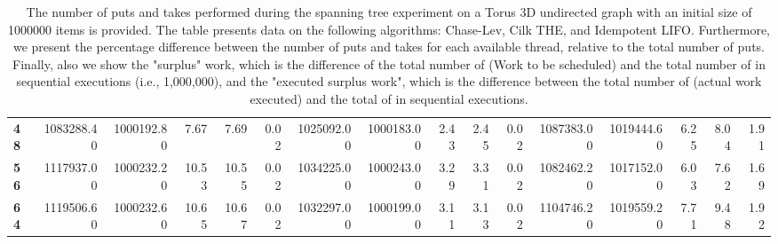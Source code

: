 \begin{table}[!ht]
{\begin{tabular}{lrrrrrrrrrrrrrrr}
\textbf{48} & 1083288.40 & 1000192.80 &           7.67 &        7.69 &                 0.02 & 1025092.00 & 1000183.00 &           2.43 &        2.45 &                 0.02 &      1087383.00 & 1019444.60 &           6.25 &        8.04 &                 1.91 \\
\textbf{56} & 1117937.00 & 1000232.20 &          10.53 &       10.55 &                 0.02 & 1034225.00 & 1000243.00 &           3.29 &        3.31 &                 0.02 &      1082462.20 & 1017152.00 &           6.03 &        7.62 &                 1.69 \\
\textbf{64} & 1119506.60 & 1000232.60 &          10.65 &       10.67 &                 0.02 & 1032297.00 & 1000199.00 &           3.11 &        3.13 &                 0.02 &      1104746.20 & 1019559.20 &           7.71 &        9.48 &                 1.92 \\
\bottomrule
\end{tabular}}
\label{difference-Torus_3D_undirected-1000000-CHASELEV-CILK-IDEMPOTENT_LIFO}
\caption{The number of puts and takes performed during the
    spanning tree experiment on a Torus 3D undirected graph with an initial size
    of 1000000 items is provided. The table presents data on the
    following algorithms: Chase-Lev, Cilk THE, and
    Idempotent LIFO. Furthermore, we present the percentage difference
    between the number of puts and takes for each available thread,
    relative to the total number of puts. Finally, also we show the
    "surplus" work, which is the difference of the total number of
    \Puts (Work to be scheduled) and the total number of \Puts in
    sequential executions (i.e., 1,000,000), and the "executed surplus
    work", which is the difference between the total number of \Takes
    (actual work executed) and the total of \Takes in sequential
    executions.}
\end{table}
